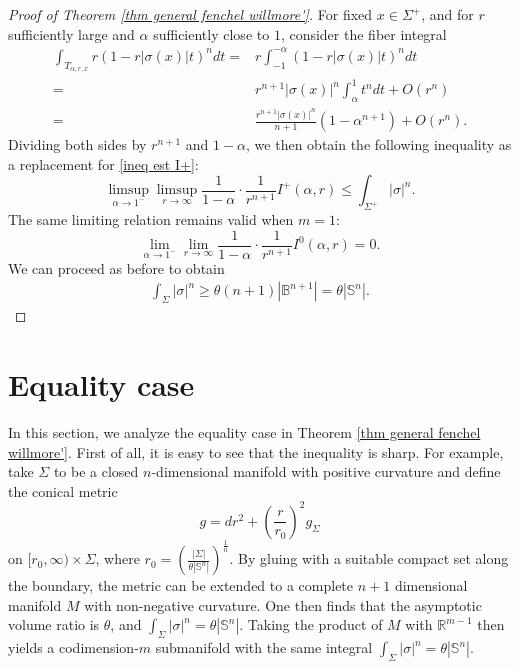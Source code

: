\documentclass[11pt, reqno]{amsart}
\numberwithin{equation}{section}
\begin{document}
\begin{proof}[Proof of Theorem \ref{thm general fenchel willmore'}]
For fixed $x\in \Sigma^+$, and for $r$ sufficiently large and $\alpha$ sufficiently close to $1$, consider the fiber integral
\begin{align*}
\int_{T_{\alpha, r, x}} r(1-r|\sigma(x)| t)^n d t
=& r\int_{-1}^{-\alpha} (1-r|\sigma(x)| t)^n d t\\
=& r^{n+1}|\sigma(x)|^n \int_\alpha^1 t^n d t+O\left(r^n\right)\\
=& \frac{r^{n+1}|\sigma(x)|^n}{n+1}\left(1-\alpha^{n+1}\right)+O\left(r^n\right).
\end{align*}
Dividing both sides by $r^{n+1}$ and $1-\alpha$, we then obtain the following inequality as a replacement for \eqref{ineq est I+}:
\begin{equation*}\label{ineq est I+'}
\limsup_{\alpha \rightarrow 1^{-}} \limsup_{r \rightarrow \infty} \frac{1}{1-\alpha} \cdot \frac{1}{r^{n+1}} I^{+}(\alpha, r) \le
\int_{\Sigma^+}|\sigma|^n.
\end{equation*}
The same limiting relation remains valid when $m=1$:
$$
\lim_{\alpha \rightarrow 1^{-}} \lim_{r \rightarrow \infty} \frac{1}{1-\alpha} \cdot \frac{1}{r^{n+1}} I^0(\alpha, r)=0.
$$
We can proceed as before to obtain
\begin{align*}
\int_{\Sigma}|\sigma|^n\ge \theta(n+1)\left|\mathbb B^{n+1}\right|=\theta |\mathbb S^n|.
\end{align*}
\end{proof}
\section{Equality case}\label{sec equality}

In this section, we analyze the equality case in Theorem \ref{thm general fenchel willmore'}. First of all, it is easy to see that the inequality is sharp. For example, take $\Sigma$ to be a closed $n$-dimensional manifold with positive curvature and define the conical metric
$$g = dr^2 + \left(\frac{r}{r_0} \right)^2 g_\Sigma$$
on $[r_0, \infty) \times \Sigma$, where $r_0 = \left(\frac{|\Sigma|}{\theta |\mathbb{S}^n|} \right)^{\frac{1}{n}}$.
By gluing with a suitable compact set along the boundary, the metric can be extended to a complete $n+1$ dimensional manifold $M$ with non-negative curvature. One then finds that the asymptotic volume ratio is $\theta$, and $\int_\Sigma |\sigma|^n = \theta |\mathbb{S}^n|$. Taking the product of $M$ with $\mathbb{R}^{m-1}$ then yields a codimension-$m$ submanifold with the same integral $\int_\Sigma |\sigma|^n = \theta |\mathbb{S}^n|$.
\end{document}
